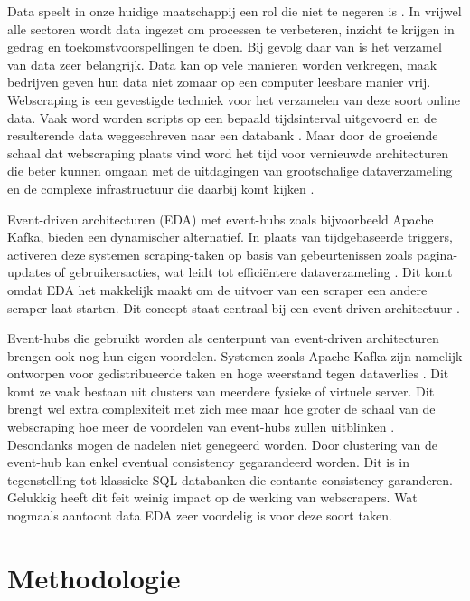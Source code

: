 Data speelt in onze huidige maatschappij een rol die niet te negeren is \autocite{lohr2012age}. In vrijwel alle sectoren wordt data ingezet om processen te verbeteren, inzicht te krijgen in gedrag en toekomstvoorspellingen te doen. Bij gevolg daar van is het verzamel van data zeer belangrijk. Data kan op vele manieren worden verkregen, maak bedrijven geven hun data niet zomaar op een computer leesbare manier vrij. Webscraping is een gevestigde techniek voor het verzamelen van deze soort online data. Vaak word worden scripts op een bepaald tijdsinterval uitgevoerd en de resulterende data weggeschreven naar een databank \autocite{zhao2022web}. Maar door de groeiende schaal dat webscraping plaats vind word het tijd voor vernieuwde architecturen die beter kunnen omgaan met de uitdagingen van grootschalige dataverzameling en de complexe infrastructuur die daarbij komt kijken \autocite{khder2021web}.

Event-driven architecturen (EDA) met event-hubs zoals bijvoorbeeld Apache Kafka, bieden een dynamischer alternatief. In plaats van tijdgebaseerde triggers, activeren deze systemen scraping-taken op basis van gebeurtenissen zoals pagina-updates of gebruikersacties, wat leidt tot efficiëntere dataverzameling \autocite{coronado2015context}. Dit komt omdat EDA het makkelijk maakt om de uitvoer van een scraper een andere scraper laat starten. Dit concept staat centraal bij een event-driven architectuur \autocite{michelson2006event}.

Event-hubs die gebruikt worden als centerpunt van event-driven architecturen brengen ook nog hun eigen voordelen. Systemen zoals Apache Kafka zijn namelijk ontworpen voor gedistribueerde taken en hoge weerstand tegen dataverlies \autocite{garg2013apache}. Dit komt ze vaak bestaan uit clusters van meerdere fysieke of virtuele server. Dit brengt wel extra complexiteit met zich mee maar hoe groter de schaal van de webscraping hoe meer de voordelen van event-hubs zullen uitblinken \autocite{vyas2022performance}. Desondanks mogen de nadelen niet genegeerd worden. Door clustering van de event-hub kan enkel eventual consistency gegarandeerd worden. Dit is in tegenstelling tot klassieke SQL-databanken die contante consistency garanderen. Gelukkig heeft dit feit weinig impact op de werking van webscrapers. Wat nogmaals aantoont data EDA zeer voordelig is voor deze soort taken.


\section{Methodologie}%
\label{sec:methodologie}

